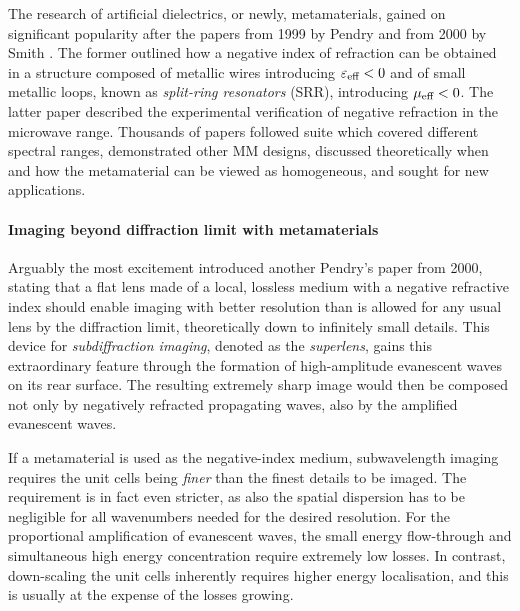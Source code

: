 The research of artificial dielectrics, or newly, metamaterials, gained on significant popularity after the papers from 1999 by Pendry \cite{pendry1999magnetism} and from 2000 by Smith \cite{smith2000composite}. The former outlined how a negative index of refraction can be obtained in a structure composed of metallic wires introducing $\varepsilon_{\text{eff} }<0$ and of small metallic loops, known as \textit{split-ring resonators} (SRR), introducing $\mu_{\text{eff} }<0$. The latter paper described the experimental verification of negative refraction in the microwave range. Thousands of papers followed suite which covered different spectral ranges, demonstrated other MM designs, discussed theoretically when and how the metamaterial can be viewed as homogeneous, and sought for new applications. 

\paragraph{Imaging beyond diffraction limit with metamaterials} %
Arguably the most excitement introduced another Pendry's paper \cite{pendry2000negative} from 2000, stating that a flat lens made of a local, lossless medium with a negative refractive index should enable imaging with better resolution than is allowed for any usual lens by the diffraction limit, theoretically down to infinitely small details. This device for \textit{subdiffraction imaging}, denoted as the \textit{superlens}, gains this extraordinary feature through the formation of high-amplitude evanescent waves on its rear surface. The resulting extremely sharp image would then be composed not only by negatively refracted propagating waves, also by the amplified evanescent waves.

If a metamaterial is used as the negative-index medium, subwavelength imaging requires the unit cells being \textit{finer} than the finest details to be imaged. The requirement is in fact even stricter, as also the spatial dispersion has to be negligible for all wavenumbers needed for the desired resolution. %
For the proportional amplification of evanescent waves, the small energy flow-through and simultaneous high energy concentration require extremely low losses. In contrast, down-scaling the unit cells inherently requires higher energy localisation, and this is usually at the expense of the losses growing.

